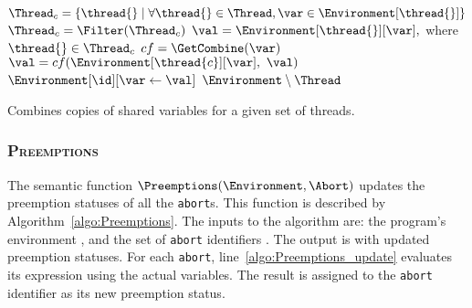 \begin{algorithm}[t]
	\begin{algorithmic}[1]
		\Function{$\Combine$}{\Environment{}, \Thread{}, \id{}}
			\ForAll {$\var \in \Shared(\Environment[\Global])$}										
				\State $\Thread_c = \lbrace \thread{} \mid \forall \thread{} \in \Thread, \var \in \Environment[\thread{}] \rbrace$	\label{algo:Combine_find}
				\State $\Thread_c = \Filter(\Thread_c)$												\label{algo:Combine_filter}
					\State $\val = \Environment[\thread{}][\var],$ where $\thread{} \in \Thread_c$	\label{algo:Combine_init}
					\State $cf = \GetCombine(\var)$													\label{algo:Combine_c}
						\State $\val = cf(\Environment[\thread{c}][\var], ~ \val)$					\label{algo:Combine_combine}
					\EndFor
					\State $\Environment[\id][\var \gets \val]$										\label{algo:Combine_assign}
				\EndIf
			\EndFor
			\State \Return $\Environment \setminus \Thread$											\label{algo:Combine_return}
		\EndFunction
	\end{algorithmic}
	
	\caption{Combines copies of shared variables for a given set of threads.}
	\label{algo:Combine}
\end{algorithm}

\subsubsection{\textsc{Preemptions}}
\label{sec:forec_Preemptions}
The semantic function $\Preemptions(\Environment, \Abort)$
updates the preemption statuses of all the \verb$abort$s. This function
is described by Algorithm~\ref{algo:Preemptions}. The inputs 
to the algorithm are: the program's environment \Environment{}, 
and the set of \verb$abort$ identifiers \Abort{}. The output is 
\Abort{} with updated preemption statuses. For each \verb$abort$, 
line~\ref{algo:Preemptions_update} evaluates its expression 
using the actual variables. The result 
is assigned to the \verb$abort$ identifier as its new preemption 
status.


